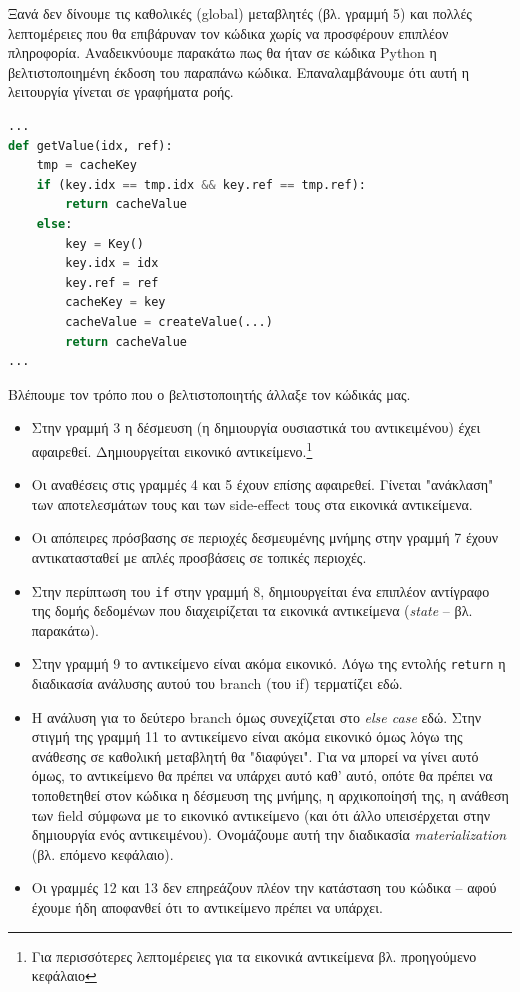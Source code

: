 Ξανά δεν δίνουμε τις καθολικές (global) μεταβλητές (βλ. γραμμή 5) και πολλές
λεπτομέρειες που θα επιβάρυναν τον κώδικα χωρίς να προσφέρουν επιπλέον
πληροφορία. Αναδεικνύουμε παρακάτω πως θα ήταν σε κώδικα Python η
βελτιστοποιημένη έκδοση του παραπάνω κώδικα. Επαναλαμβάνουμε ότι αυτή η
λειτουργία γίνεται σε γραφήματα ροής.

\begin{lstlisting}[language=Python]
...
def getValue(idx, ref):
    tmp = cacheKey
    if (key.idx == tmp.idx && key.ref == tmp.ref):
        return cacheValue
    else:
        key = Key()
        key.idx = idx
        key.ref = ref
        cacheKey = key
        cacheValue = createValue(...)
        return cacheValue
...
\end{lstlisting}

Βλέπουμε τον τρόπο που ο βελτιστοποιητής άλλαξε τον κώδικάς μας.

\begin{itemize}

\item Στην γραμμή 3 η δέσμευση (η δημιουργία ουσιαστικά του αντικειμένου) έχει
αφαιρεθεί. Δημιουργείται εικονικό αντικείμενο.\footnote{Για περισσότερες
λεπτομέρειες για τα εικονικά αντικείμενα βλ. προηγούμενο κεφάλαιο}

\item Οι αναθέσεις στις γραμμές 4 και 5 έχουν επίσης αφαιρεθεί. Γίνεται
"ανάκλαση" των αποτελεσμάτων τους και των side-effect τους στα εικονικά
αντικείμενα.

\item Οι απόπειρες πρόσβασης σε περιοχές δεσμευμένης μνήμης στην γραμμή 7 έχουν
αντικατασταθεί με απλές προσβάσεις σε τοπικές περιοχές.

\item Στην περίπτωση του \texttt{if} στην γραμμή 8, δημιουργείται ένα επιπλέον
αντίγραφο της δομής δεδομένων που διαχειρίζεται τα εικονικά αντικείμενα
(\textit{state} – βλ. παρακάτω).

\item Στην γραμμή 9 το αντικείμενο είναι ακόμα εικονικό. Λόγω της εντολής
\texttt{return} η διαδικασία ανάλυσης αυτού του branch (του if) τερματίζει εδώ.

\item Η ανάλυση για το δεύτερο branch όμως συνεχίζεται στο \textit{else case}
εδώ. Στην στιγμή της γραμμή 11 το αντικείμενο είναι ακόμα εικονικό όμως λόγω της
ανάθεσης σε καθολική μεταβλητή θα "διαφύγει". Για να μπορεί να γίνει αυτό όμως,
το αντικείμενο θα πρέπει να υπάρχει αυτό καθ' αυτό, οπότε θα πρέπει να
τοποθετηθεί στον κώδικα η δέσμευση της μνήμης, η αρχικοποίησή της, η ανάθεση των
field σύμφωνα με το εικονικό αντικείμενο (και ότι άλλο υπεισέρχεται στην
δημιουργία ενός αντικειμένου). Ονομάζουμε αυτή την διαδικασία
\textit{materialization} (βλ. επόμενο κεφάλαιο).

\item Οι γραμμές 12 και 13 δεν επηρεάζουν πλέον την κατάσταση του κώδικα – αφού
έχουμε ήδη αποφανθεί ότι το αντικείμενο πρέπει να υπάρχει.

\end{itemize}

